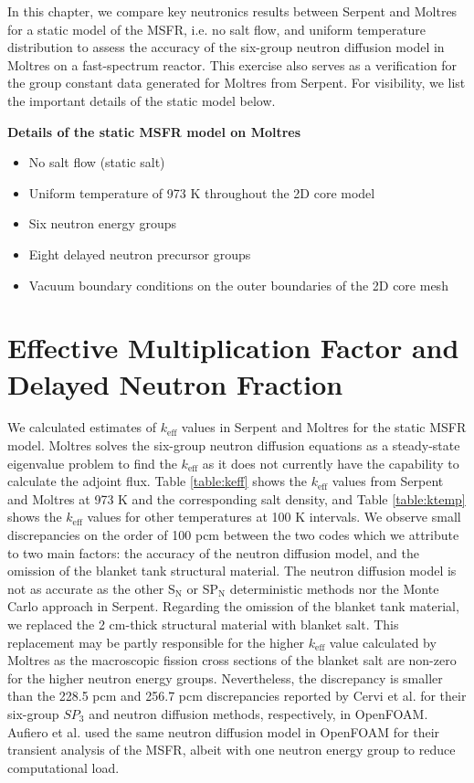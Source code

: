 In this chapter, we compare key neutronics results between Serpent and Moltres
for a static model of the \gls{MSFR}, i.e. no salt flow, and uniform
temperature distribution to assess the accuracy of the
six-group neutron diffusion model in Moltres on a fast-spectrum reactor. This
exercise also serves as a verification for the group constant data
generated for Moltres from Serpent. For visibility, we list the important
details of the static model below.

\textbf{Details of the static \gls{MSFR} model on Moltres}
\begin{itemize}
    \item No salt flow (static salt)
    \item Uniform temperature of 973 K throughout the 2D core model
    \item Six neutron energy groups
    \item Eight delayed neutron precursor groups
    \item Vacuum boundary conditions on the outer boundaries of the 2D core
    mesh
\end{itemize}

\section{Effective Multiplication Factor and Delayed Neutron Fraction}

We calculated estimates of $k_{\text{eff}}$ values in Serpent and Moltres for
the static \gls{MSFR} model. Moltres solves the six-group neutron diffusion equations as a
steady-state eigenvalue problem to find the $k_{\text{eff}}$ as it does not
currently have the capability to calculate the adjoint flux. Table
\ref{table:keff} shows the $k_{\text{eff}}$ values from Serpent and Moltres at
973 K and the corresponding salt density, and Table \ref{table:ktemp} shows
the $k_{\text{eff}}$ values for other temperatures at 100 K intervals. We
observe small discrepancies on the order of 100 pcm between the two codes
which we attribute to two main factors: the accuracy of the neutron diffusion
model, and the omission of the blanket tank structural material. The neutron
diffusion model is not as accurate as the other S$_{\text{N}}$ or
SP$_{\text{N}}$ deterministic methods nor the Monte Carlo approach in Serpent.
Regarding the omission of the blanket tank material, we replaced the
2 cm-thick structural material with blanket salt. This replacement may be
partly responsible for the higher $k_{\text{eff}}$ value calculated by Moltres
as the macroscopic fission cross sections of the blanket salt are non-zero for
the higher neutron energy groups. Nevertheless, the discrepancy is smaller
than the 228.5 pcm and 256.7 pcm discrepancies reported by Cervi et al.
\cite{cervi_development_2019} for their six-group $SP_3$ and neutron
diffusion methods, respectively, in OpenFOAM. Aufiero et al.
\cite{aufiero_development_2014} used the same neutron diffusion model in
OpenFOAM for their transient analysis of the \gls{MSFR}, albeit with one
neutron energy group to reduce computational load.

